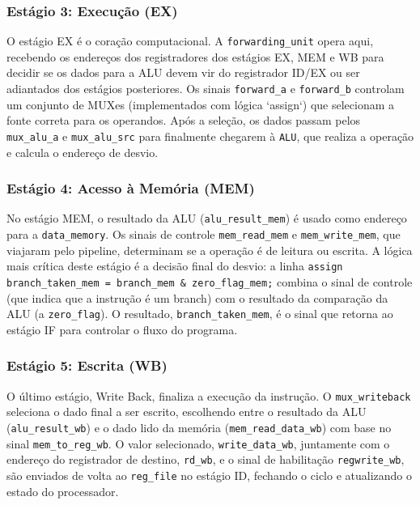 \documentclass[12pt, a4paper]{article}
\begin{document}
\subsubsection*{Estágio 3: Execução (EX)}
O estágio EX é o coração computacional. A \texttt{forwarding\_unit} opera aqui, recebendo os endereços dos registradores dos estágios EX, MEM e WB para decidir se os dados para a ALU devem vir do registrador ID/EX ou ser adiantados dos estágios posteriores. Os sinais \texttt{forward\_a} e \texttt{forward\_b} controlam um conjunto de MUXes (implementados com lógica `assign`) que selecionam a fonte correta para os operandos. Após a seleção, os dados passam pelos \texttt{mux\_alu\_a} e \texttt{mux\_alu\_src} para finalmente chegarem à \texttt{ALU}, que realiza a operação e calcula o endereço de desvio.

\subsubsection*{Estágio 4: Acesso à Memória (MEM)}
No estágio MEM, o resultado da ALU (\texttt{alu\_result\_mem}) é usado como endereço para a \texttt{data\_memory}. Os sinais de controle \texttt{mem\_read\_mem} e \texttt{mem\_write\_mem}, que viajaram pelo pipeline, determinam se a operação é de leitura ou escrita. A lógica mais crítica deste estágio é a decisão final do desvio: a linha \texttt{assign branch\_taken\_mem = branch\_mem \& zero\_flag\_mem;} combina o sinal de controle (que indica que a instrução é um branch) com o resultado da comparação da ALU (a \texttt{zero\_flag}). O resultado, \texttt{branch\_taken\_mem}, é o sinal que retorna ao estágio IF para controlar o fluxo do programa.

\subsubsection*{Estágio 5: Escrita (WB)}
O último estágio, Write Back, finaliza a execução da instrução. O \texttt{mux\_writeback} seleciona o dado final a ser escrito, escolhendo entre o resultado da ALU (\texttt{alu\_result\_wb}) e o dado lido da memória (\texttt{mem\_read\_data\_wb}) com base no sinal \texttt{mem\_to\_reg\_wb}. O valor selecionado, \texttt{write\_data\_wb}, juntamente com o endereço do registrador de destino, \texttt{rd\_wb}, e o sinal de habilitação \texttt{regwrite\_wb}, são enviados de volta ao \texttt{reg\_file} no estágio ID, fechando o ciclo e atualizando o estado do processador.
\end{document}
